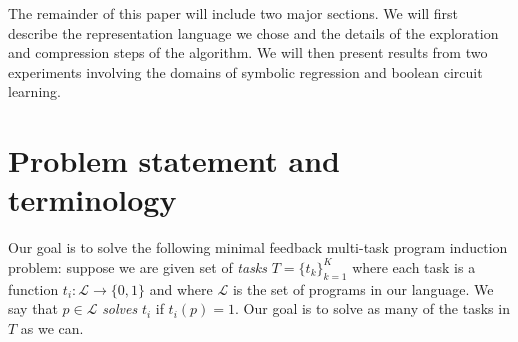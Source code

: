 \documentclass{article}
\begin{document}
The remainder of this paper will include two major sections.  We will
first describe the representation language we chose and the details of
the exploration and compression steps of the algorithm. We will then
present results from two experiments involving the domains of
symbolic regression and boolean circuit learning.






\section{Problem statement and terminology}
Our goal is to solve the following minimal feedback multi-task program
induction problem: suppose we are given set of \emph{tasks}
$T=\{t_k\}_{k=1}^K$ where each task is a function $t_i : \mathcal{L}
\rightarrow \{0, 1\}$ and where $\mathcal{L}$ is the set of programs
in our language.  We say that $ p \in \mathcal{L}$ \emph{solves} $t_i$
if $ t_i(p) = 1$. Our goal is to solve as many of the tasks in $T$ as
we can.
\end{document}
